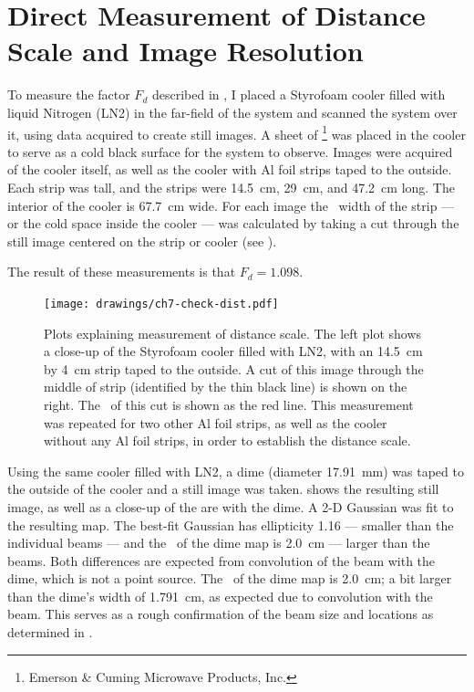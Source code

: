 \section{Direct Measurement of Distance Scale and Image Resolution} \label{sec:ch7-dist-scale}

To measure the factor $F_d$ described in , I placed a Styrofoam cooler filled with liquid Nitrogen (LN2) in the far-field of the system and scanned the system over it, using data acquired to create still images.
A sheet of \ecco\footnote{Emerson \& Cuming Microwave Products, Inc.} was placed in the cooler to serve as a cold black surface for the system to observe.
Images were acquired of the cooler itself, as well as the cooler with Al foil strips taped to the outside.
Each strip was  tall, and the strips were \SI{14.5}{\cm}, \SI{29}{\cm}, and \SI{47.2}{\cm} long.
The interior of the cooler is \SI{67.7}{\cm} wide.
For each image the \FWHM\ width of the strip --- or the cold space inside the cooler --- was calculated by taking a cut through the still image centered on the strip or cooler (see ).

The result of these measurements is that $F_d = 1.098$.

\begin{figure}
\centering
\texttt{[image: drawings/ch7-check-dist.pdf]}
\caption[Distance scale measurements]{
  Plots explaining measurement of distance scale.
  The left plot shows a close-up of the Styrofoam cooler filled with LN2, with an \SI{14.5}{\cm} by \SI{4}{\cm} strip taped to the outside.
  A cut of this image through the middle of strip (identified by the thin black line) is shown on the right.
  The \FWHM\ of this cut is shown as the red line.
  This measurement was repeated for two other Al foil strips, as well as the cooler without any Al foil strips, in order to establish the distance scale.
}
\label{fig:ch7-check-dist}
\end{figure}


Using the same cooler filled with LN2, a dime (diameter \SI{17.91}{\mm}) was taped to the outside of the cooler and a still image was taken.
 shows the resulting still image, as well as a close-up of the are with the dime.
A 2-D Gaussian was fit to the resulting map.
The best-fit Gaussian has ellipticity 1.16 --- smaller than the individual beams --- and the \FWHM\ of the dime map is \SI{2.0}{\cm} --- larger than the beams.
Both differences are expected from convolution of the beam with the dime, which is not a point source.
The \FWHM\ of the dime map is \SI{2.0}{\cm}; a bit larger than the dime's width of \SI{1.791}{\cm}, as expected due to convolution with the beam.
This serves as a rough confirmation of the beam size and locations as determined in .

